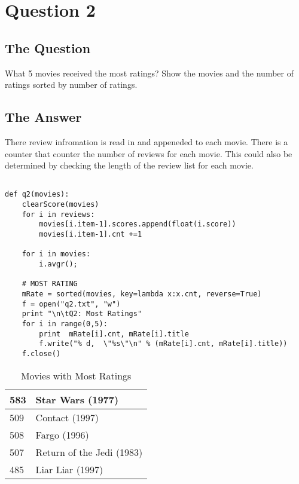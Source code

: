 \section{Question 2}

\subsection{The Question}

\begin{flushleft}

What 5 movies received the most ratings? Show the movies and
the number of ratings sorted by number of ratings.

\end{flushleft}
\subsection{The Answer}

There review infromation is read in and appeneded to each movie. There is a counter that counter the number of reviews for each movie. This could also be determined by checking the length of the review list for each movie. 


\begin{lstlisting}[caption={Python code for question 2}]

def q2(movies):
	clearScore(movies)
	for i in reviews:
		movies[i.item-1].scores.append(float(i.score))
		movies[i.item-1].cnt +=1

	for i in movies:
		i.avgr();

	# MOST RATING
	mRate = sorted(movies, key=lambda x:x.cnt, reverse=True)
	f = open("q2.txt", "w")
	print "\n\tQ2: Most Ratings"
	for i in range(0,5):
		print  mRate[i].cnt, mRate[i].title
		f.write("% d,  \"%s\"\n" % (mRate[i].cnt, mRate[i].title))
	f.close()

\end{lstlisting}

\begin{flushleft}

\begin{table}[h]
\centering
\setlength{\tabcolsep}{12pt}
\begin{tabular}{|ll|}

\hline
583 & Star Wars (1977)          \\ \hline
509 & Contact (1997)            \\ \hline
508 & Fargo (1996)              \\ \hline
507 & Return of the Jedi (1983) \\ \hline
485 & Liar Liar (1997)         \\ \hline
\end{tabular}
\caption{Movies with Most Ratings}
\end{table}
\end{flushleft}





